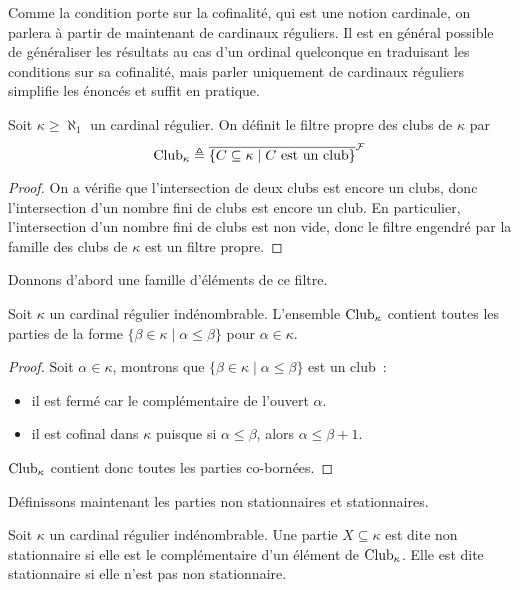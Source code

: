 Comme la condition porte sur la cofinalité, qui est une notion cardinale, on
parlera à partir de maintenant de cardinaux réguliers. Il est en général
possible de généraliser les résultats au cas d'un ordinal quelconque en
traduisant les conditions sur sa cofinalité, mais parler uniquement de cardinaux
réguliers simplifie les énoncés et suffit en pratique.

\begin{definition}
  Soit $\kappa \geq \aleph_1$ un cardinal régulier. On définit le filtre propre
  des clubs de $\kappa$ par
  \[\operatorname{Club}_\kappa \triangleq \overline{\{C\subseteq \kappa
    \mid C\text{ est un club}\}}^{\mathcal F}\]
\end{definition}

\begin{proof}
  On a vérifie que l'intersection de deux clubs est encore un clubs, donc
  l'intersection d'un nombre fini de clubs est encore un club. En particulier,
  l'intersection d'un nombre fini de clubs est non vide, donc le filtre engendré
  par la famille des clubs de $\kappa$ est un filtre propre.
\end{proof}

Donnons d'abord une famille d'éléments de ce filtre.

\begin{property}
  Soit $\kappa$ un cardinal régulier indénombrable. L'ensemble $\operatorname{Club}_\kappa$
  contient toutes les parties de la forme
  $\{\beta \in\kappa\mid \alpha\leq\beta\}$ pour $\alpha \in \kappa$.
\end{property}

\begin{proof}
  Soit $\alpha \in \kappa$, montrons que $\{\beta\in\kappa\mid\alpha\leq\beta\}$
  est un club~:
  \begin{itemize}
  \item il est fermé car le complémentaire de l'ouvert $\alpha$.
  \item il est cofinal dans $\kappa$ puisque si $\alpha \leq \beta$, alors
    $\alpha \leq \beta + 1$.
  \end{itemize}
  $\operatorname{Club}_\kappa$ contient donc toutes les parties co-bornées.
\end{proof}

Définissons maintenant les parties non stationnaires et stationnaires.

\begin{definition}
  Soit $\kappa$ un cardinal régulier indénombrable. Une partie
  $X\subseteq\kappa$ est dite non stationnaire si elle est le complémentaire
  d'un élément de $\operatorname{Club}_\kappa$. Elle est dite stationnaire si elle n'est pas
  non stationnaire.
\end{definition}

